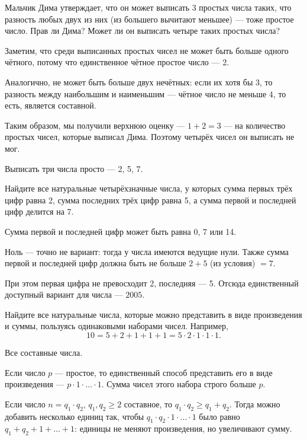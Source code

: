 

\begin{itemize}

	\itA Мальчик Дима утверждает, что он может выписать 3 простых числа таких, что разность любых двух из них (из большего вычитают меньшее) — тоже простое число. Прав ли Дима? Может ли он выписать четыре таких простых числа?
	
	\itr Заметим, что среди выписанных простых чисел не может быть больше одного чётного, потому что единственное чётное простое число — 2.
	
	Аналогично, не может быть больше двух нечётных: если их хотя бы 3, то разность между наибольшим и наименьшим — чётное число не меньше 4, то есть, является составной.

	Таким образом, мы получили верхнюю оценку — $1+2=3$ — на количество простых чисел, которые выписал Дима. Поэтому четырёх чисел он выписать не мог.
	
	Выписать три числа просто — 2, 5, 7.

	\itB Найдите все натуральные четырёхзначные числа, у которых сумма первых трёх цифр равна 2, сумма последних трёх цифр равна 5, а сумма первой и последней цифр делится на 7.
	
	\itr Сумма первой и последней цифр может быть равна 0, 7 или 14.
	
	Ноль — точно не вариант: тогда у числа имеются ведущие нули. Также сумма первой и последней цифр должна быть не больше $2+5$ (из условия) $=7$.
	
	При этом первая цифра не превосходит 2, последняя — 5. Отсюда единственный доступный вариант для числа — $2005$.
	
	\itC Найдите все натуральные числа, которые можно представить в виде произведения и суммы, пользуясь одинаковыми наборами чисел. Например,
	$$10 = 5+2+1+1+1 = 5 \cdot 2 \cdot 1 \cdot 1 \cdot 1.$$
	
	\itr Все составные числа.
	
	Если число $p$ — простое, то единственный способ представить его в виде произведения — $p \cdot 1 \cdot \ldots \cdot 1$. Сумма чисел этого набора строго больше $p$.
	
	Если число $n = q_1 \cdot q_2$, $q_1, q_2 \ge 2$ составное, то $q_1 \cdot q_2 \ge q_1 + q_2$. Тогда можно добавить несколько единиц так, чтобы $q_1 \cdot q_2 \cdot 1 \cdot \ldots \cdot 1$ было равно $q_1 + q_2 + 1 + \ldots + 1$: единицы не меняют произведения, но увеличивают сумму.

\end{itemize}

